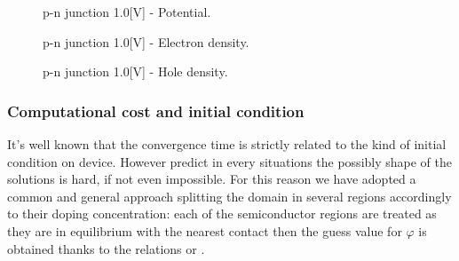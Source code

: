 \begin{figure}[!h]
\centering
{}
\hspace{0.7cm}
\caption{p-n junction 1.0[V] - Potential.}
\label{fig: diode potential 1V}
\end{figure}

\vspace{1cm}

\begin{figure}[!h]
\centering
{}
\hspace{0.7cm}
\caption{p-n junction 1.0[V] -  Electron density.}
\label{fig: ndensity 1V}
\end{figure}

\vspace{1cm}

\begin{figure}[!h]
\centering
{}
\hspace{0.7cm}
\caption{p-n junction 1.0[V] - Hole density.}
\label{fig: pdensity 1V}
\end{figure}

\clearpage

\subsubsection{Computational cost and initial condition}

It's well known that the convergence time is strictly related to the kind of initial condition on device. However predict in every situations the possibly shape of the solutions is hard, if not even impossible. For this reason we have adopted a common and general approach splitting the domain in several regions accordingly to their doping concentration: each of the semiconductor regions are treated as they are in equilibrium with the nearest contact then the guess value for $\varphi$ is obtained thanks to the relations  or . 


